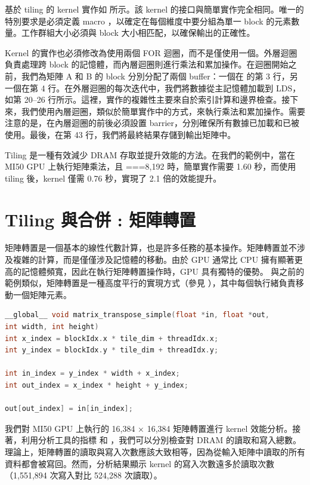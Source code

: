 基於 tiling 的 kernel 實作如  所示。該 kernel 的接口與簡單實作完全相同。唯一的特別要求是必須定義 macro ，以確定在每個維度中要分組為單一 block 的元素數量。工作群組大小必須與 block 大小相匹配，以確保輸出的正確性。

Kernel 的實作也必須修改為使用兩個 FOR 迴圈，而不是僅使用一個。外層迴圈負責處理跨 block 的記憶體，而內層迴圈則進行乘法和累加操作。在迴圈開始之前，我們為矩陣 A 和 B 的 block 分別分配了兩個 buffer：一個在  的第 3 行，另一個在第 4 行。在外層迴圈的每次迭代中，我們將數據從主記憶體加載到 LDS，如第 20–26 行所示。這裡，實作的複雜性主要來自於索引計算和邊界檢查。接下來，我們使用內層迴圈，類似於簡單實作中的方式，來執行乘法和累加操作。需要注意的是，在內層迴圈的前後必須設置 barrier，分別確保所有數據已加載和已被使用。最後，在第 43 行，我們將最終結果存儲到輸出矩陣中。

Tiling 是一種有效減少 DRAM 存取並提升效能的方法。在我們的範例中，當在 MI50 GPU 上執行矩陣乘法，且 ===8,192 時，簡單實作需要 1.60 秒，而使用 tiling 後，kernel 僅需 0.76 秒，實現了 2.1 倍的效能提升。

\section{Tiling 與合併 : 矩陣轉置}
矩陣轉置是一個基本的線性代數計算，也是許多任務的基本操作。矩陣轉置並不涉及複雜的計算，而是僅僅涉及記憶體的移動。由於 GPU 通常比 CPU 擁有顯著更高的記憶體頻寬，因此在執行矩陣轉置操作時，GPU 具有獨特的優勢。
與之前的範例類似，矩陣轉置是一種高度平行的實現方式（參見 ），其中每個執行緒負責移動一個矩陣元素。

\begin{lstlisting}[language=C, caption={簡單矩陣轉置的 kernel 範例。}, captionpos=t, label={lst:transpose}]
__global__ void matrix_transpose_simple(float *in, float *out,
int width, int height)
int x_index = blockIdx.x * tile_dim + threadIdx.x;
int y_index = blockIdx.y * tile_dim + threadIdx.y;

int in_index = y_index * width + x_index;
int out_index = x_index * height + y_index;

out[out_index] = in[in_index];
\end{lstlisting}

我們對 MI50 GPU 上執行的 16,384 × 16,384 矩陣轉置進行 kernel 效能分析。接著，利用分析工具的指標  和 ，我們可以分別檢查對 DRAM 的讀取和寫入總數。理論上，矩陣轉置的讀取與寫入次數應該大致相等，因為從輸入矩陣中讀取的所有資料都會被寫回。然而，分析結果顯示 kernel 的寫入次數遠多於讀取次數（1,551,894 次寫入對比 524,288 次讀取）。

